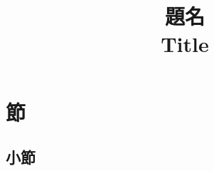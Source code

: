 \documentclass[conference,compsoc,a4paper]{IEEEtran}
\title{
  \vskip-10mm\mdseries\mcfamily
  題名\\
  Title
  \vspace{-3mm}
}
\author{
  \IEEEauthorblockN{
    \normalfont
    姓 名\IEEEauthorrefmark{1}\\
    Last First
  }
  \IEEEauthorblockA{
    \normalfont
    所属\\
    Email: 
    \thanks{
      \normalfont
      \IEEEauthorrefmark{1}Supervisor: Prof. 
    }
    \vspace{-3mm}
  }
}
\begin{document}
\maketitle

\begin{abstract}
\end{abstract}

\section{節}

\subsection{小節}


% 
% 

\vspace{-0.2mm}
\end{document}
